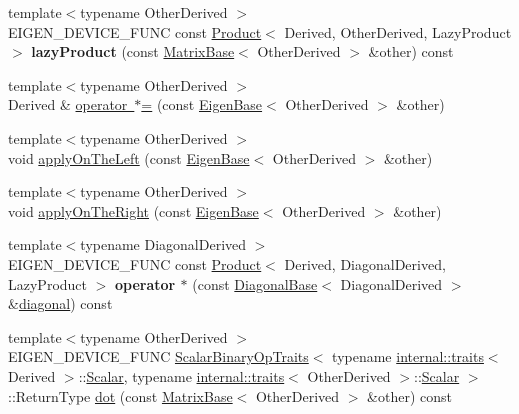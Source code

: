 \begin{DoxyCompactItemize}
\item 
\mbox{\label{class_eigen_1_1_matrix_base_aae99414664fc24c23848644d8bf94103}} 
{\footnotesize template$<$typename Other\+Derived $>$ }\\E\+I\+G\+E\+N\+\_\+\+D\+E\+V\+I\+C\+E\+\_\+\+F\+U\+NC const \mbox{\hyperlink{class_eigen_1_1_product}{Product}}$<$ Derived, Other\+Derived, Lazy\+Product $>$ {\bfseries lazy\+Product} (const \mbox{\hyperlink{class_eigen_1_1_matrix_base}{Matrix\+Base}}$<$ Other\+Derived $>$ \&other) const
\item 
{\footnotesize template$<$typename Other\+Derived $>$ }\\Derived \& \mbox{\hyperlink{class_eigen_1_1_matrix_base_aaa2fc32463392a7488686e6f3007f278}{operator $\ast$=}} (const \mbox{\hyperlink{struct_eigen_1_1_eigen_base}{Eigen\+Base}}$<$ Other\+Derived $>$ \&other)
\item 
{\footnotesize template$<$typename Other\+Derived $>$ }\\void \mbox{\hyperlink{class_eigen_1_1_matrix_base_a3a08ad41e81d8ad4a37b5d5c7490e765}{apply\+On\+The\+Left}} (const \mbox{\hyperlink{struct_eigen_1_1_eigen_base}{Eigen\+Base}}$<$ Other\+Derived $>$ \&other)
\item 
{\footnotesize template$<$typename Other\+Derived $>$ }\\void \mbox{\hyperlink{class_eigen_1_1_matrix_base_a45d91752925d2757fc8058a293b15462}{apply\+On\+The\+Right}} (const \mbox{\hyperlink{struct_eigen_1_1_eigen_base}{Eigen\+Base}}$<$ Other\+Derived $>$ \&other)
\item 
\mbox{\label{class_eigen_1_1_matrix_base_a27067ca48e02b78e883250fe6a156964}} 
{\footnotesize template$<$typename Diagonal\+Derived $>$ }\\E\+I\+G\+E\+N\+\_\+\+D\+E\+V\+I\+C\+E\+\_\+\+F\+U\+NC const \mbox{\hyperlink{class_eigen_1_1_product}{Product}}$<$ Derived, Diagonal\+Derived, Lazy\+Product $>$ {\bfseries operator $\ast$} (const \mbox{\hyperlink{class_eigen_1_1_diagonal_base}{Diagonal\+Base}}$<$ Diagonal\+Derived $>$ \&\mbox{\hyperlink{class_eigen_1_1_matrix_base_ab5768147536273eb2dbdfa389cfd26a3}{diagonal}}) const
\item 
{\footnotesize template$<$typename Other\+Derived $>$ }\\E\+I\+G\+E\+N\+\_\+\+D\+E\+V\+I\+C\+E\+\_\+\+F\+U\+NC \mbox{\hyperlink{struct_eigen_1_1_scalar_binary_op_traits}{Scalar\+Binary\+Op\+Traits}}$<$ typename \mbox{\hyperlink{struct_eigen_1_1internal_1_1traits}{internal\+::traits}}$<$ Derived $>$\+::\mbox{\hyperlink{class_eigen_1_1_dense_base_a5feed465b3a8e60c47e73ecce83e39a2}{Scalar}}, typename \mbox{\hyperlink{struct_eigen_1_1internal_1_1traits}{internal\+::traits}}$<$ Other\+Derived $>$\+::\mbox{\hyperlink{class_eigen_1_1_dense_base_a5feed465b3a8e60c47e73ecce83e39a2}{Scalar}} $>$\+::Return\+Type \mbox{\hyperlink{class_eigen_1_1_matrix_base_a2c84258ecc93fc1a0a2d4fa22b99dd99}{dot}} (const \mbox{\hyperlink{class_eigen_1_1_matrix_base}{Matrix\+Base}}$<$ Other\+Derived $>$ \&other) const

\end{DoxyCompactItemize}
